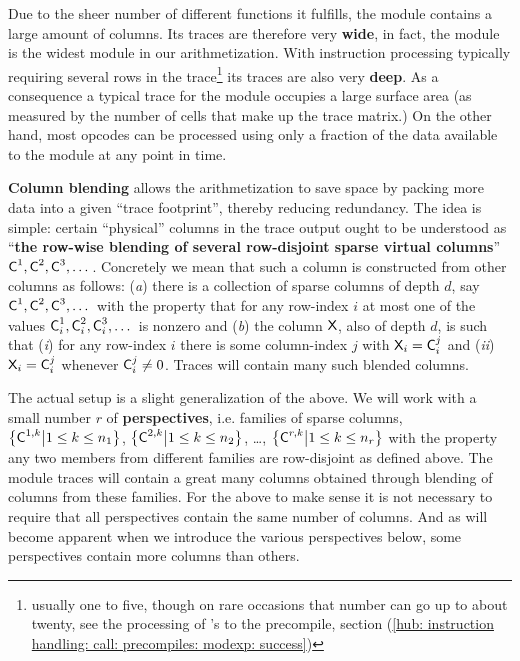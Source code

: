 Due to the sheer number of different functions it fulfills, the \hubMod{} module contains a large amount of columns.
Its traces are therefore very \textbf{wide}, in fact, the \hubMod{} module is the widest module in our arithmetization.
With instruction processing typically requiring several rows in the \hubMod{} trace\footnote{usually one to five, though on rare occasions that number can go up to about twenty, see the processing of 's to the  precompile, section (\ref{hub: instruction handling: call: precompiles: modexp: success})} its traces are also very \textbf{deep}.
As a consequence a typical trace for the \hubMod{} module occupies a large surface area (as measured by the number of cells that make up the trace matrix.)
On the other hand, most opcodes can be processed using only a fraction of the data available to the \hubMod{} module at any point in time.

\textbf{Column blending} allows the arithmetization to save space by packing more data into a given ``trace footprint'', thereby reducing redundancy.
The idea is simple: certain ``physical'' columns  in the trace output ought to be understood as ``\textbf{the row-wise blending of several row-disjoint sparse virtual columns}'' $\textsf{C}^1, \textsf{C}^2, \textsf{C}^3, \dots{}$.
Concretely we mean that such a column  is constructed from other columns as follows:
(\emph{a}) there is a collection of sparse columns of depth $d$, say $\textsf{C}^1, \textsf{C}^2, \textsf{C}^3, \dots{}$ with the property that for any row-index $i$ at most one of the values $\textsf{C}^1_{i}, \textsf{C}^2_{i}, \textsf{C}^3_{i}, \dots{}$ is nonzero and
(\emph{b}) the column $\textsf{X}$, also of depth $d$, is such that
(\emph{i})  for any row-index $i$ there is some column-index $j$ with $\textsf{X}_{i} = \textsf{C}^{j}_{i}$ and
(\emph{ii}) $\textsf{X}_{i} = \textsf{C}^{j}_{i}$ whenever $\textsf{C}^{j}_{i} \neq 0$.
Traces will contain many such blended columns.

The actual setup is a slight generalization of the above.
We will work with a small number $r$ of \textbf{perspectives}, i.e. families of sparse columns,
$\big \{ \textsf{C}^{1, k} \big| 1\leq k \leq n_{1}\big \}$,
$\big \{ \textsf{C}^{2, k} \big| 1\leq k \leq n_{2}\big \}$,
\dots,
$\big \{ \textsf{C}^{r, k} \big| 1\leq k \leq n_{r}\big \}$
with the property any two members from different families are row-disjoint as defined above.
The \hubMod{} module traces will contain a great many columns obtained through blending of columns from these families.
\saNote{} For the above to make sense it is not necessary to require that all perspectives contain the same number of columns.
And as will become apparent when we introduce the various perspectives below, some perspectives contain more columns than others.

